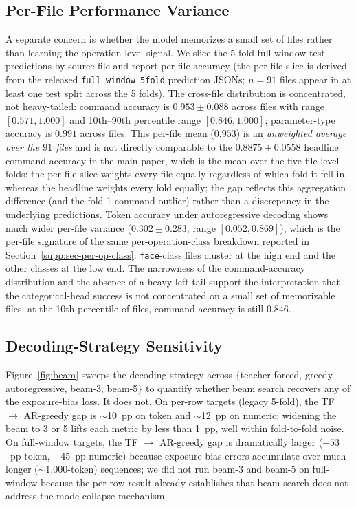 \documentclass[11pt,a4paper]{article}
\begin{document}
\subsection{Per-File Performance Variance}
\label{app:perfile}

A separate concern is whether the model memorizes a small set of files rather than learning the operation-level signal. We slice the 5-fold full-window test predictions by source file and report per-file accuracy (the per-file slice is derived from the released \texttt{full\_window\_5fold} prediction JSONs; $n=91$ files appear in at least one test split across the 5 folds). The cross-file distribution is concentrated, not heavy-tailed: command accuracy is $0.953 \pm 0.088$ across files with range $[0.571, 1.000]$ and 10th--90th percentile range $[0.846, 1.000]$; parameter-type accuracy is $0.991$ across files. This per-file mean ($0.953$) is an \emph{unweighted average over the $91$ files} and is not directly comparable to the $0.8875 \pm 0.0558$ headline command accuracy in the main paper, which is the mean over the five file-level folds: the per-file slice weights every file equally regardless of which fold it fell in, whereas the headline weights every fold equally; the gap reflects this aggregation difference (and the fold-1 command outlier) rather than a discrepancy in the underlying predictions. Token accuracy under autoregressive decoding shows much wider per-file variance ($0.302 \pm 0.283$, range $[0.052, 0.869]$), which is the per-file signature of the same per-operation-class breakdown reported in Section~\ref{supp:sec-per-op-class}: \texttt{face}-class files cluster at the high end and the other classes at the low end. The narrowness of the command-accuracy distribution and the absence of a heavy left tail support the interpretation that the categorical-head success is not concentrated on a small set of memorizable files: at the 10th percentile of files, command accuracy is still $0.846$.

\subsection{Decoding-Strategy Sensitivity}
\label{app:decoding}

Figure~\ref{fig:beam} sweeps the decoding strategy across $\{$teacher-forced, greedy autoregressive, beam-3, beam-5$\}$ to quantify whether beam search recovers any of the exposure-bias loss. It does not. On per-row targets (legacy 5-fold), the TF $\to$ AR-greedy gap is $\sim$10~pp on token and $\sim$12~pp on numeric; widening the beam to 3 or 5 lifts each metric by less than 1~pp, well within fold-to-fold noise. On full-window targets, the TF $\to$ AR-greedy gap is dramatically larger ($-53$~pp token, $-45$~pp numeric) because exposure-bias errors accumulate over much longer ($\sim$1{,}000-token) sequences; we did not run beam-3 and beam-5 on full-window because the per-row result already establishes that beam search does not address the mode-collapse mechanism.
\end{document}
